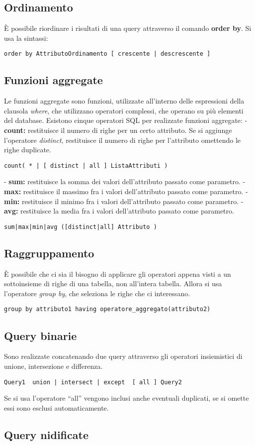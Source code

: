 \documentclass[\main/main.tex]{subfiles}
\begin{document}
\subsection{Ordinamento}
È possibile riordinare i risultati di una query attraverso il comando \textbf{order by}.
Si usa la sintassi:
\begin{verbatim}
order by AttributoOrdinamento [ crescente | descrescente ]
\end{verbatim}

\subsection{Funzioni aggregate}
Le funzioni aggregate sono funzioni, utilizzate all'interno delle espressioni della clausola \textit{where}, che utilizzano operatori complessi, che operano su più elementi del database.
Esistono cinque operatori SQL per realizzate funzioni aggregate:
- \textbf{count:} restituisce il numero di righe per un certo attributo. Se si aggiunge l'operatore \textit{distinct}, restituisce il numero di righe per l'attributo omettendo le righe duplicate.
\begin{verbatim}
count( * | [ distinct | all ] ListaAttributi )
\end{verbatim}
- \textbf{sum:} restituisce la somma dei valori dell'attributo passato come parametro.
- \textbf{max:} restituisce il massimo fra i valori dell'attributo passato come parametro.
- \textbf{min:} restituisce il minimo fra i valori dell'attributo passato come parametro.
- \textbf{avg:} restituisce la media fra i valori dell'attributo passato come parametro.
\begin{verbatim}
sum|max|min|avg ([distinct|all] Attributo )
\end{verbatim}

\subsection{Raggruppamento}
È possibile che ci sia il bisogno di applicare gli operatori appena visti a un sottoinsieme di righe di una tabella, non all'intera tabella.
Allora si usa l'operatore \textit{group by}, che seleziona le righe che ci interessano.
\begin{verbatim}
group by attributo1 having operatore_aggregato(attributo2)
\end{verbatim}

\subsection{Query binarie}
Sono realizzate concatenando due query attraverso gli operatori insiemistici di unione, intersezione e differenza.
\begin{verbatim}
Query1  union | intersect | except  [ all ] Query2
\end{verbatim}
Se si usa l'operatore ``all'' vengono inclusi anche eventuali duplicati, se si omette essi sono esclusi automaticamente.

\subsection{Query nidificate}
\end{document}
